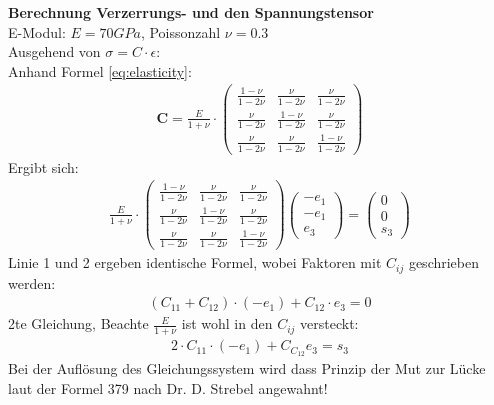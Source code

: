 \textbf{Berechnung Verzerrungs- und den Spannungstensor}\\
E-Modul: $E = 70 GPa$, Poissonzahl $\nu = 0.3$\\
Ausgehend von $\sigma = C \cdot \epsilon$:\\
Anhand Formel \ref{eq:elasticity}:
\begin{align}
	\mathbf{C} = \frac{E}{1 + \nu} \cdot \begin{pmatrix}
		\frac{1-\nu}{1-2\nu} & \frac{\nu}{1-2\nu} & \frac{\nu}{1-2\nu}\\
		\frac{\nu}{1-2\nu} & \frac{1-\nu}{1-2\nu} & \frac{\nu}{1-2\nu}\\
		\frac{\nu}{1-2\nu} & \frac{\nu}{1-2\nu} & \frac{1-\nu}{1-2\nu}
	\end{pmatrix}
\end{align}
Ergibt sich:
\begin{align}
	\frac{E}{1 + \nu} \cdot \begin{pmatrix}
		\frac{1-\nu}{1-2\nu} & \frac{\nu}{1-2\nu} & \frac{\nu}{1-2\nu}\\
		\frac{\nu}{1-2\nu} & \frac{1-\nu}{1-2\nu} & \frac{\nu}{1-2\nu}\\
		\frac{\nu}{1-2\nu} & \frac{\nu}{1-2\nu} & \frac{1-\nu}{1-2\nu}
	\end{pmatrix}
	\begin{pmatrix}
		-e_1\\ -e_1\\ e_3
	\end{pmatrix}
	=
	\begin{pmatrix}
		0\\ 0\\ s_3
	\end{pmatrix}
\end{align}
Linie 1 und 2 ergeben identische Formel, wobei Faktoren mit $C_{ij}$
geschrieben werden:
\begin{align}
	(C_{11} + C_{12}) \cdot (-e_1) + C_{12} \cdot e_3 = 0
\end{align}
2te Gleichung, Beachte $\frac{E}{1+\nu}$ ist wohl in den $C_{ij}$ versteckt:
\begin{align}
	2 \cdot C_{11} \cdot (-e_1) + C_{C_12} e_3 = s_3
\end{align}
Bei der Auflösung des Gleichungssystem wird dass Prinzip der Mut zur Lücke laut
der Formel 379 nach Dr. D. Strebel angewahnt!